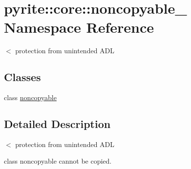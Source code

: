 \hypertarget{namespacepyrite_1_1core_1_1noncopyable__}{}\section{pyrite\+:\+:core\+:\+:noncopyable\+\_\+ Namespace Reference}
\label{namespacepyrite_1_1core_1_1noncopyable__}


$<$ protection from unintended A\+DL  


\subsection*{Classes}
\begin{DoxyCompactItemize}
\item 
class \mbox{\hyperlink{classpyrite_1_1core_1_1noncopyable___1_1noncopyable}{noncopyable}}
\end{DoxyCompactItemize}


\subsection{Detailed Description}
$<$ protection from unintended A\+DL 

class noncopyable cannot be copied. 